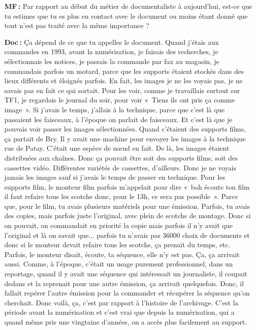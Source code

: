 \textbf{MF :} Par rapport au début du métier de documentaliste à aujourd'hui, est-ce que tu estimes que tu es plus en contact avec le document ou moins étant donné que tout n'est pas traité avec la même importance ? 

\textbf{Doc :} Ça dépend de ce que tu appelles le document. Quand j'étais aux commandes en 1993, avant la numérisation, je faisais des recherches, je sélectionnais les notices, je passais la commande par fax au magasin, je commandais parfois un motard, parce que les supports étaient stockés dans des lieux différents et éloignés parfois. En fait, les images je ne les voyais pas, je ne savais pas en fait ce qui sortait. Pour les voir, comme je travaillais surtout sur TF1, je regardais le journal du soir, pour voir « Tiens ils ont pris ça comme image ». Si j'avais le temps, j'allais à la technique, parce que c'est là que passaient les faisceaux, à l'époque on parlait de faisceaux. Et c'est là que je pouvais voir passer les images sélectionnées. Quand c'étaient des supports films, ça partait de Bry. Il y avait une machine pour envoyer les images à la technique rue de Patay. C’était une espèce de nœud en fait. De là, les images étaient distribuées aux chaînes. Donc ça pouvait être soit des supports films, soit des cassettes vidéo. Différentes variétés de cassettes, d'ailleurs. Donc je ne voyais jamais les images sauf si j'avais le temps de passer en technique. Pour les supports film, le monteur film parfois m'appelait pour dire « bah écoute ton film il faut refaire tous les scotchs donc, pour le 13h, ce sera pas possible ». Parce que, pour le film, tu avais plusieurs matériels pour une émission. Parfois, tu avais des copies, mais parfois juste l'original, avec plein de scotchs de montage. Donc si on pouvait, on commandait en priorité la copie mais parfois il n'y avait que l'original et là on savait que...  parfois tu n'avais pas 36000 choix de documents et donc si le monteur devait refaire tous les scotchs, ça prenait du temps, etc. Parfois, le monteur disait, écoute, ta séquence, elle n'y est pas.  Ça, ça arrivait aussi. Comme, à l'époque, c'était un usage purement professionnel, dans un reportage, quand il y avait une séquence qui intéressait un journaliste, il coupait dedans et la reprenait pour une autre émission, ça arrivait quelquefois. Donc, il fallait repérer l'autre émission pour la commander et récupérer la séquence qu'on cherchait. Donc voilà, ça, c'est par rapport à l'histoire de l’archivage. C'est la période avant la numérisation et c'est vrai que depuis la numérisation, qui a quand même pris une vingtaine d'années, on a accès plus facilement au support.

